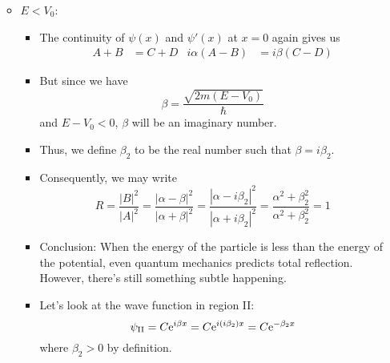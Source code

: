 \documentclass[../notes.tex]{subfiles}
\begin{document}
\begin{itemize}
\begin{itemize}
\begin{itemize}
\begin{equation*}
            \end{equation*}
        \end{itemize}
        \item $E<V_0$:
        \begin{itemize}
            \item The continuity of $\psi(x)$ and $\psi'(x)$ at $x=0$ again gives us
            \begin{align*}
                A+B &= C+D&
                i\alpha(A-B) &= i\beta(C-D)
            \end{align*}
            \item But since we have
            \begin{equation*}
                \beta = \frac{\sqrt{2m(E-V_0)}}{\hbar}
            \end{equation*}
            and $E-V_0<0$, $\beta$ will be an imaginary number.
            \item Thus, we define $\beta_2$ to be the real number such that $\beta=i\beta_2$.
            \item Consequently, we may write
            \begin{equation*}
                R = \frac{|B|^2}{|A|^2} = \frac{|\alpha-\beta|^2}{|\alpha+\beta|^2} = \frac{|\alpha-i\beta_2|^2}{|\alpha+i\beta_2|^2} = \frac{\alpha^2+\beta_2^2}{\alpha^2+\beta_2^2} = 1
            \end{equation*}
            \item Conclusion: When the energy of the particle is less than the energy of the potential, even quantum mechanics predicts total reflection. However, there's still something subtle happening.
            \item Let's look at the wave function in region II:
            \begin{equation*}
                \psi_\text{II} = C\e[i\beta x] = C\e[i(i\beta_2)x] = C\e[-\beta_2x]
            \end{equation*}
            where $\beta_2>0$ by definition.
            \begin{figure}[H]
                \centering
\end{figure}
\end{itemize}
\end{itemize}
\end{itemize}
\end{document}

